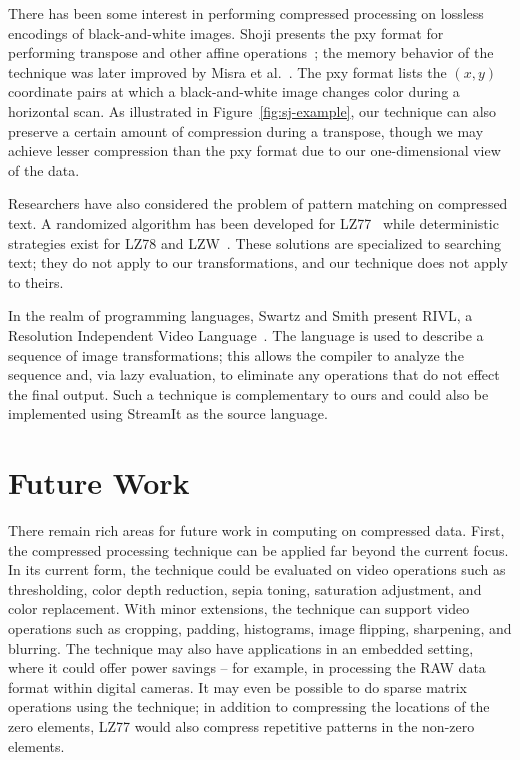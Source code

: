 There has been some interest in performing compressed processing on
lossless encodings of black-and-white images.  Shoji presents the pxy
format for performing transpose and other affine
operations~\cite{shoji95}; the memory behavior of the technique was
later improved by Misra et al.~\cite{misra99}.  
The pxy format lists the $(x,y)$ coordinate pairs at which a
black-and-white image changes color during a horizontal scan.  As
illustrated in Figure~\ref{fig:sj-example}, our technique can also
preserve a certain amount of compression during a transpose, though we
may achieve lesser compression than the pxy format due to our
one-dimensional view of the data.

Researchers have also considered the problem of pattern matching on
compressed text.  A randomized algorithm has been developed for
LZ77~\cite{farach98matching} while deterministic strategies exist for
LZ78 and LZW~\cite{navarro03regular,navarro05lzgrep}.  These solutions
are specialized to searching text; they do not apply to our
transformations, and our technique does not apply to theirs.

In the realm of programming languages, Swartz and Smith present RIVL,
a Resolution Independent Video Language~\cite{swartz95}.  The language
is used to describe a sequence of image transformations; this allows
the compiler to analyze the sequence and, via lazy evaluation, to
eliminate any operations that do not effect the final output.  Such a
technique is complementary to ours and could also be implemented using
StreamIt as the source language.

\section{Future Work}
\label{sec:future}


There remain rich areas for future work in computing on compressed
data.  First, the compressed processing technique can be applied far
beyond the current focus.  In its current form, the technique could be
evaluated on video operations such as thresholding, color depth
reduction, sepia toning, saturation adjustment, and color replacement.
With minor extensions, the technique can support video operations such
as cropping, padding, histograms, image flipping, sharpening, and
blurring.  The technique may also have applications in an embedded
setting, where it could offer power savings -- for example, in
processing the RAW data format within digital cameras.  It may even be
possible to do sparse matrix operations using the technique; in
addition to compressing the locations of the zero elements, LZ77 would
also compress repetitive patterns in the non-zero elements.

